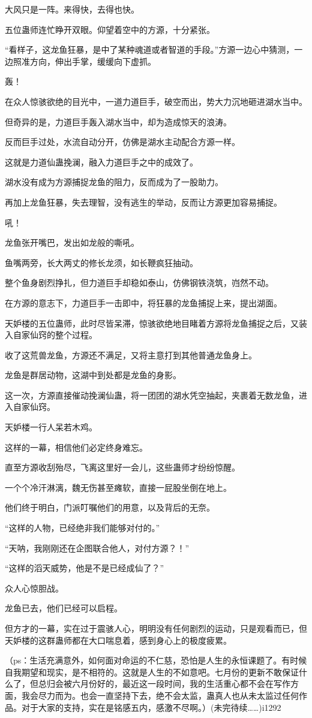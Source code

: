 \begin{this_body}
大风只是一阵。来得快，去得也快。

五位蛊师连忙睁开双眼。仰望着空中的方源，十分紧张。

“看样子，这龙鱼狂暴，是中了某种魂道或者智道的手段。”方源一边心中猜测，一边照准方向，伸出手掌，缓缓向下虚抓。

轰！

在众人惊骇欲绝的目光中，一道力道巨手，破空而出，势大力沉地砸进湖水当中。

但奇异的是，力道巨手轰入湖水当中，却为造成惊天的浪涛。

反而巨手过处，水流自动分开，仿佛是湖水主动配合方源一样。

这就是力道仙蛊挽澜，融入力道巨手之中的成效了。

湖水没有成为方源捕捉龙鱼的阻力，反而成为了一股助力。

再加上龙鱼狂暴，失去理智，没有逃生的举动，反而让方源更加容易捕捉。

吼！

龙鱼张开嘴巴，发出如龙般的嘶吼。

鱼嘴两旁，长大两丈的修长龙须，如长鞭疯狂抽动。

整个鱼身剧烈挣扎，但力道巨手却稳如泰山，仿佛钢铁浇筑，岿然不动。

在方源的意志下，力道巨手一击即中，将狂暴的龙鱼捕捉上来，提出湖面。

天妒楼的五位蛊师，此时尽皆呆滞，惊骇欲绝地目睹着方源将龙鱼捕捉之后，又装入自家仙窍的整个过程。

收了这荒兽龙鱼，方源还不满足，又将主意打到其他普通龙鱼身上。

龙鱼是群居动物，这湖中到处都是龙鱼的身影。

这一次，方源直接催动挽澜仙蛊，将一团团的湖水凭空抽起，夹裹着无数龙鱼，进入自家仙窍。

天妒楼一行人呆若木鸡。

这样的一幕，相信他们必定终身难忘。

直至方源收刮殆尽，飞离这里好一会儿，这些蛊师才纷纷惊醒。

一个个冷汗淋漓，魏无伤甚至瘫软，直接一屁股坐倒在地上。

他们终于明白，门派叮嘱他们的用意，以及背后的无奈。

“这样的人物，已经绝非我们能够对付的。”

“天呐，我刚刚还在企图联合他人，对付方源？！”

“这样的滔天威势，他是不是已经成仙了？”

众人心惊胆战。

龙鱼已去，他们已经可以启程。

但方才的一幕，实在过于震骇人心，明明没有任何剧烈的运动，只是观看而已，但天妒楼的这群蛊师都在大口喘息着，感到身心上的极度疲累。

（ps：生活充满意外，如何面对命运的不仁慈，恐怕是人生的永恒课题了。有时候自我期望和现实，是不相符的。这就是人生的不如意吧。七月份的更新不敢保证什么了，但总归会被六月份好的，最近这一段时间，我的生活重心都不会在写作方面，我会尽力而为。也会一直坚持下去，绝不会太监，蛊真人也从未太监过任何作品。对于大家的支持，实在是铭感五内，感激不尽啊。）(未完待续……)i1292

\end{this_body}

